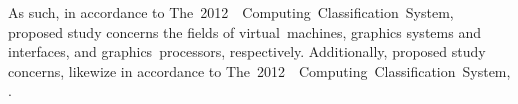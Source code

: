As such, in accordance to The~2012~\dvttermacm ~Computing~Classification~System, proposed study concerns the fields of virtual~machines, graphics systems and interfaces,  and graphics~processors, respectively. Additionally, proposed study concerns, likewize in accordance to The~2012~\dvttermacm ~Computing~Classification~System, \dvttermintel .
